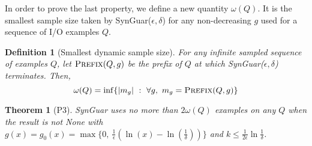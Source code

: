 \documentclass[11pt]{extarticle}
\newtheorem{theorem}{Theorem}[section]
\newtheorem{definition}{Definition}
\newcommand{\tool}{{\sc SynGuar}\xspace}
\newcommand{\parf}{g}
\begin{document}
In order to prove the last property, we define a new quantity $\omega(Q)$. It is the smallest sample size taken by \tool($\epsilon, \delta$) for any non-decreasing $g$ used for a sequence of I/O examples $Q$.

\begin{definition}[Smallest dynamic sample size]
    For any infinite sampled sequence of examples $Q$, let $\Call{Prefix}{Q,g}$ be the prefix of $Q$ at which \tool($\epsilon, \delta$) terminates. Then,  
    $$
    \omega(Q) = \inf \{ |m_g|~:~\forall g,\text{ } m_g = \Call{Prefix}{Q,g}\}
    $$
\end{definition}


\begin{theorem}[P3]
\label{thm:p3}
\tool uses no more than $2\omega(Q)$ examples on any $Q$ when the result is not None with $\parf(x) = \parf_{0}(x)=\max\{0, ~\frac{1}{\epsilon}(\ln(x)-\ln(\frac{1}{\delta}))\}$ and $k\leq \frac{1}{2\epsilon}\ln\frac{1}{\delta}$.
\end{theorem}
\end{document}
